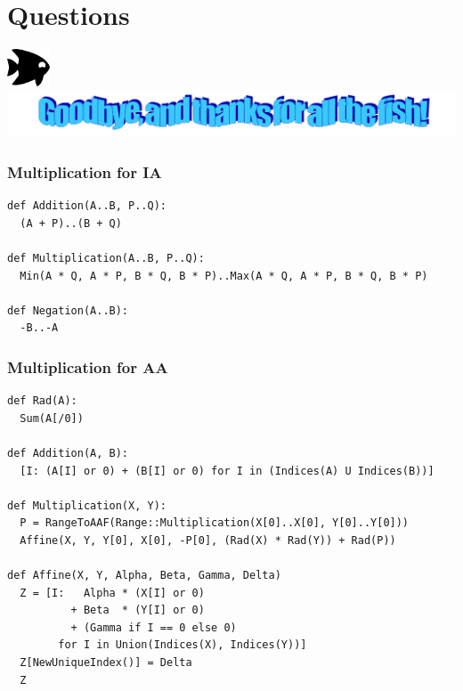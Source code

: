 \documentclass{beamer}
\begin{document}
\section{Questions}

\begin{frame}[containsverbatim]
\begin{center}
\Large
\includegraphics[height=3em]{figures/spadefish.png}\\[2em]
\includegraphics[width=\textwidth]{figures/wordart.png}\\[2em]
\end{center}
\end{frame}

\begin{frame}[containsverbatim]
\frametitle{Multiplication for IA}
\footnotesize
\begin{verbatim}
def Addition(A..B, P..Q):
  (A + P)..(B + Q)

def Multiplication(A..B, P..Q):
  Min(A * Q, A * P, B * Q, B * P)..Max(A * Q, A * P, B * Q, B * P)

def Negation(A..B):
  -B..-A
\end{verbatim}
\end{frame}

\begin{frame}[containsverbatim]
\frametitle{Multiplication for AA}
\footnotesize
\begin{verbatim}
def Rad(A):
  Sum(A[/0])

def Addition(A, B):
  [I: (A[I] or 0) + (B[I] or 0) for I in (Indices(A) U Indices(B))]

def Multiplication(X, Y):
  P = RangeToAAF(Range::Multiplication(X[0]..X[0], Y[0]..Y[0]))
  Affine(X, Y, Y[0], X[0], -P[0], (Rad(X) * Rad(Y)) + Rad(P))

def Affine(X, Y, Alpha, Beta, Gamma, Delta)
  Z = [I:   Alpha * (X[I] or 0)
          + Beta  * (Y[I] or 0)
          + (Gamma if I == 0 else 0)
        for I in Union(Indices(X), Indices(Y))]
  Z[NewUniqueIndex()] = Delta
  Z
\end{verbatim}
\end{frame}
\end{document}
